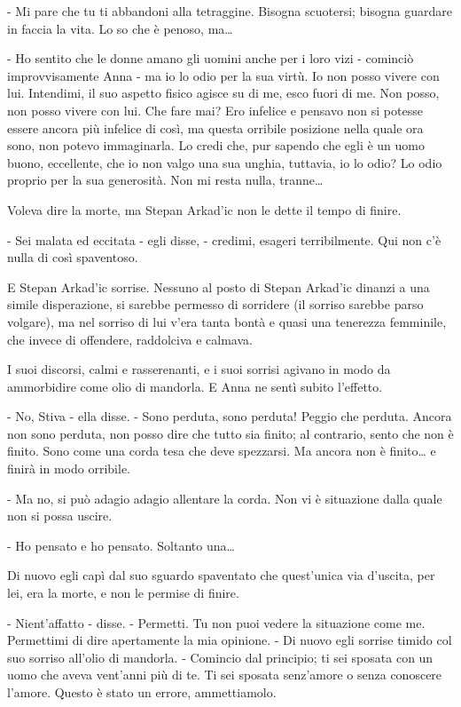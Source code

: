 - Mi pare che tu ti abbandoni alla tetraggine. Bisogna scuotersi; bisogna guardare in faccia la vita. Lo so che è penoso, ma\ldots{} 

- Ho sentito che le donne amano gli uomini anche per i loro vizi - cominciò improvvisamente Anna - ma io lo odio per la sua virtù. Io non posso vivere con lui. Intendimi, il suo aspetto fisico agisce su di me, esco fuori di me. Non posso, non posso vivere con lui. Che fare mai? Ero infelice e pensavo non si potesse essere ancora più infelice di così, ma questa orribile posizione nella quale ora sono, non potevo immaginarla. Lo credi che, pur sapendo che egli è un uomo buono, eccellente, che io non valgo una sua unghia, tuttavia, io lo odio? Lo odio proprio per la sua generosità. Non mi resta nulla, tranne\ldots{} 

Voleva dire la morte, ma Stepan Arkad'ic non le dette il tempo di finire. 

- Sei malata ed eccitata - egli disse, - credimi, esageri terribilmente. Qui non c'è nulla di così spaventoso. 

E Stepan Arkad'ic sorrise. Nessuno al posto di Stepan Arkad'ic dinanzi a una simile disperazione, si sarebbe permesso di sorridere (il sorriso sarebbe parso volgare), ma nel sorriso di lui v'era tanta bontà e quasi una tenerezza femminile, che invece di offendere, raddolciva e calmava. 

I suoi discorsi, calmi e rasserenanti, e i suoi sorrisi agivano in modo da ammorbidire come olio di mandorla. E Anna ne sentì subito l'effetto. 

- No, Stiva - ella disse. - Sono perduta, sono perduta! Peggio che perduta. Ancora non sono perduta, non posso dire che tutto sia finito; al contrario, sento che non è finito. Sono come una corda tesa che deve spezzarsi. Ma ancora non è finito\ldots{} e finirà in modo orribile. 

- Ma no, si può adagio adagio allentare la corda. Non vi è situazione dalla quale non si possa uscire. 

- Ho pensato e ho pensato. Soltanto una\ldots{} 

Di nuovo egli capì dal suo sguardo spaventato che quest'unica via d'uscita, per lei, era la morte, e non le permise di finire. 

- Nient'affatto - disse. - Permetti. Tu non puoi vedere la situazione come me. Permettimi di dire apertamente la mia opinione. - Di nuovo egli sorrise timido col suo sorriso all'olio di mandorla. - Comincio dal principio; ti sei sposata con un uomo che aveva vent'anni più di te. Ti sei sposata senz'amore o senza conoscere l'amore. Questo è stato un errore, ammettiamolo. 

